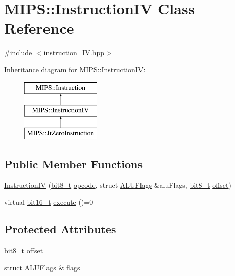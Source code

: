 \hypertarget{classMIPS_1_1InstructionIV}{}\section{M\+I\+PS\+:\+:Instruction\+IV Class Reference}
\label{classMIPS_1_1InstructionIV}


{\ttfamily \#include $<$instruction\+\_\+\+I\+V.\+hpp$>$}

Inheritance diagram for M\+I\+PS\+:\+:Instruction\+IV\+:\begin{figure}[H]
\begin{center}
\leavevmode
\includegraphics[height=3.000000cm]{classMIPS_1_1InstructionIV}
\end{center}
\end{figure}
\subsection*{Public Member Functions}
\begin{DoxyCompactItemize}
\item 
\hyperlink{classMIPS_1_1InstructionIV_a9219778a142dd2f6114ecf39bf9d24f3}{Instruction\+IV} (\hyperlink{core_8hpp_a6074bae122ae7b527864eec42c728c3c}{bit8\+\_\+t} \hyperlink{classMIPS_1_1Instruction_a45cc6808b5dde8a5d41067d148b55476}{opcode}, struct \hyperlink{structMIPS_1_1ALUFlags}{A\+L\+U\+Flags} \&alu\+Flags, \hyperlink{core_8hpp_a6074bae122ae7b527864eec42c728c3c}{bit8\+\_\+t} \hyperlink{classMIPS_1_1InstructionIV_abcb91e65c800a41bf9c46b5770120b36}{offset})
\item 
virtual \hyperlink{core_8hpp_adc265a970bc35995b5879784bbb3f1b7}{bit16\+\_\+t} \hyperlink{classMIPS_1_1InstructionIV_ae9eeb2c1aa5392cc3e2d9f2d816b799c}{execute} ()=0
\end{DoxyCompactItemize}
\subsection*{Protected Attributes}
\begin{DoxyCompactItemize}
\item 
\hyperlink{core_8hpp_a6074bae122ae7b527864eec42c728c3c}{bit8\+\_\+t} \hyperlink{classMIPS_1_1InstructionIV_abcb91e65c800a41bf9c46b5770120b36}{offset}
\item 
struct \hyperlink{structMIPS_1_1ALUFlags}{A\+L\+U\+Flags} \& \hyperlink{classMIPS_1_1InstructionIV_a7858449be2ee97f8ed852f7b8e8b4879}{flags}
\end{DoxyCompactItemize}


